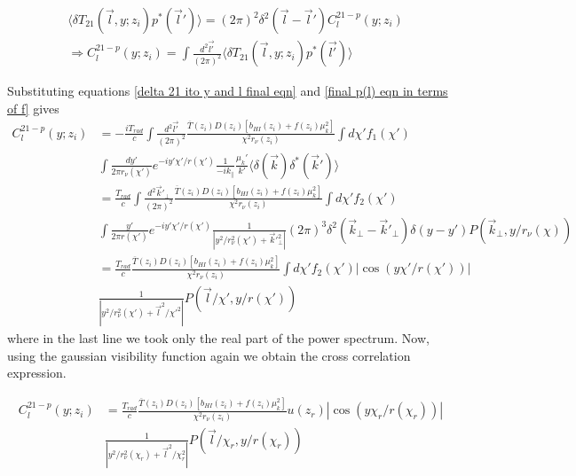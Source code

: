 \documentclass[12pt]{article}
\begin{document}
\begin{equation}
\begin{aligned}
&\langle  \delta T_{21}(\vec{l},y;z_i)p^*(\vec{l}')\rangle  =(2\pi)^2\delta^2(\vec{l}-\vec{l}')C_l^{21-p}(y;z_i)\\&
\Rightarrow C_l^{21-p}(y;z_i)=\int \frac{d^2\vec{l'}}{(2\pi)^2} \langle  \delta T_{21}(\vec{l},y;z_i) p^*(\vec{l'})\rangle  
\end{aligned}
\end{equation}

Substituting equations \ref{delta 21 ito y and l final eqn} and \ref{final p(l) eqn in terms of f} gives
\begin{equation}
\begin{aligned}
C_l^{21-p}(y;z_i)&=-\frac{iT_{rad} }{c} \int \frac{d^2\vec{l'}}{(2\pi)^2}\frac{\overline{T}(z_i)D(z_i)[b_{HI}(z_i)+f(z_i)\mu_k^2]}{\chi ^2r_\nu(z_i)}\int d\chi' f_1(\chi') \\&\int \frac{dy'}{2\pi r_\nu(\chi')} e^{-iy'\chi'/r(\chi')}\frac{1}{-ik_{\parallel}} \frac{\mu_k'}{k'} \langle \delta(\vec{k})\delta^*(\vec{k}')\rangle\\&
=\frac{T_{rad}}{c} \int \frac{d^2\vec{k}'_\bot}{(2\pi)^2}\frac{\overline{T}(z_i)D(z_i)[b_{HI}(z_i)+f(z_i)\mu_k^2]}{\chi ^2r_\nu(z_i)}\int d\chi' f_2(\chi') \\
& \int \frac{y'}{2\pi r(\chi')} e^{-iy'\chi'/r(\chi')} \frac{1}{|y^2/r^2_\nu(\chi')+\vec{k}'^2_\perp|}(2 \pi)^3 \delta^2(\vec{k}_{\bot}-\vec{k}'_\bot)\delta(y-y')P(\vec{k}_{\bot},y/r_\nu(\chi))\\&
=\frac{T_{rad}}{c} \frac{\overline{T}(z_i)D(z_i)[b_{HI}(z_i)+f(z_i)\mu_k^2]}{\chi ^2r_\nu(z_i)}\int d\chi' f_2(\chi') |\cos({y\chi'/r(\chi')})|\\ &\frac{1}{|y^2/r^2_\nu(\chi')+\vec{l}^2/\chi'^2|}P(\vec{l}/\chi',y/r(\chi'))
\end{aligned}
\end{equation}
where in the last line we took only the real part of the power spectrum.  Now, using the gaussian visibility function again we obtain the cross correlation expression.

\begin{equation}
\begin{aligned}
C_l^{21-p}(y;z_i)&=\frac{T_{rad}}{c} \frac{\overline{T}(z_i)D(z_i)[b_{HI}(z_i)+f(z_i)\mu_k^2]}{\chi ^2r_\nu(z_i)} u(z_r) |\cos({y\chi_r/r(\chi_r)})|\\ &\frac{1}{|y^2/r^2_\nu(\chi_r)+\vec{l}^2/\chi_r^2|}P(\vec{l}/\chi_r,y/r(\chi_r))
\end{aligned}
\end{equation}
\end{document}
